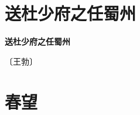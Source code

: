 \documentclass[12pt,UTF-8,openany,fontset=none]{ctexbook}
\begin{document}
\vspace{8pt}
\clearpage

\section{送杜少府之任蜀州}



\begin{center}
    {\bfseries 送杜少府之任蜀州}
\end{center}

\begin{center}
    \vspace{10pt}
    
    \begin{large}
        
        〔王勃〕
        
    \end{large}
    
    \vspace{8pt}
    
    \begin{huge}
        
        \phantom{。}

        \phantom{。}
        
        \phantom{。}

        \phantom{。}
        
        \phantom{。}

        \phantom{。}
        
        \phantom{。}

        \phantom{。}
        
    \end{huge}
    
\end{center}

\vspace{8pt}
\clearpage

\section{春望}

\end{document}

